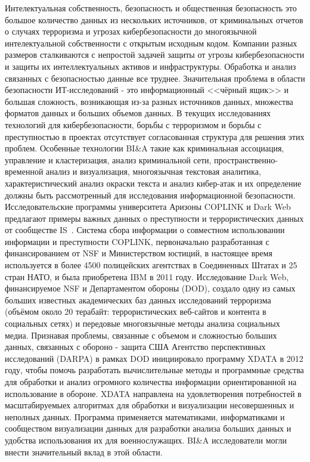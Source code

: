 Интелектуальная собственность, безопасность и общественная безопасность это большое количество данных из нескольких источников, от криминальных
отчетов о случаях терроризма и угрозах кибербезопасности
до многоязычной интелектуальной собственности с открытым исходным кодом. Компании разных
размеров сталкиваются с непростой задачей защиты от
угрозы кибербезопасности и защиты их интеллектуальных активов
и инфраструктуры. Обработка и анализ связанных с безопасностью данные все труднее. Значительная проблема
в области безопасности ИТ-исследований - это информационный <<чёрный ящик>> и большая сложность, возникающая из-за разных источников данных, множества форматов данных и больших объемов данных. В текущих исследованиях технологий
для кибербезопасности, борьбы с терроризмом и борьбы с преступностью
в проектах отсутствует согласованная структура для
решения этих проблем. Особенные технологии BI\&A
такие как криминальная ассоциация, управление и кластеризация,
анализ криминальной сети, пространственно-временной анализ и
визуализация, многоязычная текстовая аналитика, характеристический 
анализ окраски текста и анализ кибер-атак и их определение должны быть
рассмотренный для исследования информационной безопасности. Исследовательские программы университета Аризоны COPLINK и Dark Web предлагают примеры важных данных о преступности и террористических данных от сообществе IS~\cite{Chen:2006}. Система сбора информации о совместном использовании информации и преступности COPLINK, первоначально разработанная с финансированием
от NSF и Министерством юстиций, в настоящее время используется в
более 4500 полицейских агентствах в Соединенных Штатах и
25 стран НАТО, и была приобретена IBM в 2011 году.
Исследование Dark Web, финансируемое NSF и Департаментом
обороны (DOD), создало одну из самых больших известных
академических баз данных исследований терроризма (объёмом около 20 терабайт: террористических веб-сайтов и контента в социальных сетях) и
передовые многоязычные методы анализа социальных медиа.
Признавая проблемы, связанные с объемом и
сложностью больших данных, связанных с обороно - защита США
Агентство перспективных исследований (DARPA) в рамках DOD
инициировало программу XDATA в 2012 году, чтобы помочь разработать вычислительные
методы и программные средства для обработки и
анализ огромного количества информации ориентированной на использование в обороне. XDATA направлена ​​на удовлетворения потребностей в
масштабируемыех алгоритмах для обработки и визуализации
несовершенных и неполных данных. Программа применяется
математиками, информатиками и сообществом визуализации данных для
разработки анализа больших данных и удобства использования
их для военнослужащих.
BI\&A исследователи могли внести значительный вклад
в этой области.


